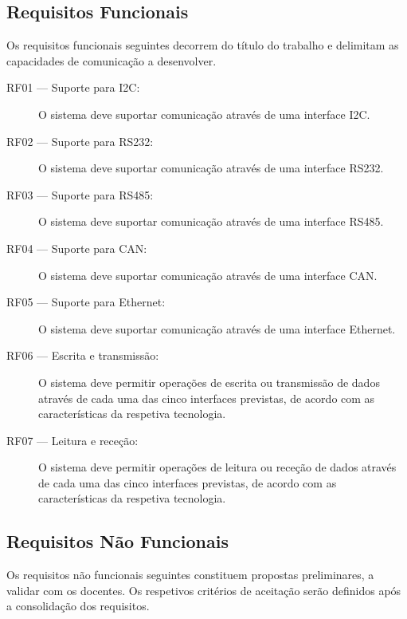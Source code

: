 \subsection{Requisitos Funcionais}

Os requisitos funcionais seguintes decorrem do título do trabalho e
delimitam as capacidades de comunicação a desenvolver.

\begin{description}
    \item[RF01 --- Suporte para I2C:]
    O sistema deve suportar comunicação através de uma interface I2C.

    \item[RF02 --- Suporte para RS232:]
    O sistema deve suportar comunicação através de uma interface RS232.

    \item[RF03 --- Suporte para RS485:]
    O sistema deve suportar comunicação através de uma interface RS485.

    \item[RF04 --- Suporte para CAN:]
    O sistema deve suportar comunicação através de uma interface CAN.

    \item[RF05 --- Suporte para Ethernet:]
    O sistema deve suportar comunicação através de uma interface Ethernet.

    \item[RF06 --- Escrita e transmissão:]
    O sistema deve permitir operações de escrita ou transmissão de dados
    através de cada uma das cinco interfaces previstas, de acordo com as
    características da respetiva tecnologia.

    \item[RF07 --- Leitura e receção:]
    O sistema deve permitir operações de leitura ou receção de dados
    através de cada uma das cinco interfaces previstas, de acordo com as
    características da respetiva tecnologia.
\end{description}

\subsection{Requisitos Não Funcionais}

Os requisitos não funcionais seguintes constituem propostas preliminares,
a validar com os docentes. Os respetivos critérios de aceitação serão
definidos após a consolidação dos requisitos.

